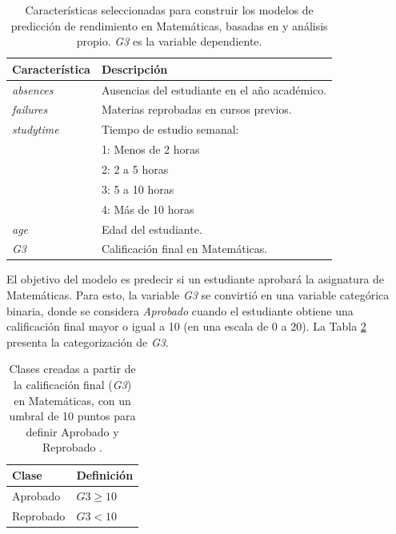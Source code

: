 \begin{table}[H]
    \centering
    \begin{tabular}{ll}
        \toprule
        \textbf{Característica} & \textbf{Descripción} \\
        \midrule
        \textit{absences} & Ausencias del estudiante en el año académico. \\
        \textit{failures} & Materias reprobadas en cursos previos. \\
        \textit{studytime} & Tiempo de estudio semanal: \\
            & 1: Menos de 2 horas \\
            & 2: 2 a 5 horas \\
            & 3: 5 a 10 horas \\
            & 4: Más de 10 horas \\
        \textit{age} & Edad del estudiante. \\
        \midrule
        \textit{G3} & Calificación final en Matemáticas. \\
        \bottomrule
    \end{tabular}
    \caption{Características seleccionadas para construir los modelos de predicción de rendimiento en Matemáticas, basadas en \cite{cortez-2014} y análisis propio. \textit{G3} es la variable dependiente.}
    \label{tab:math-data-vars}
\end{table}

El objetivo del modelo es predecir si un estudiante aprobará la asignatura de Matemáticas. Para esto, la variable \textit{G3} se convirtió en una variable categórica binaria, donde se considera \textit{Aprobado} cuando el estudiante obtiene una calificación final mayor o igual a 10 (en una escala de 0 a 20). La Tabla \ref{tab:math-data-clases} presenta la categorización de \textit{G3}.

\begin{table}[H]
    \centering
    \begin{tabular}{ll}
        \toprule
        \textbf{Clase} & \textbf{Definición} \\
        \midrule
        Aprobado & $G3 \geq 10$\\
        Reprobado & $G3 < 10$ \\
        \bottomrule
    \end{tabular}
    \caption{Clases creadas a partir de la calificación final (\textit{G3}) en Matemáticas, con un umbral de 10 puntos para definir Aprobado y Reprobado \cite{cortez2014student}.}
    \label{tab:math-data-clases}
\end{table}

